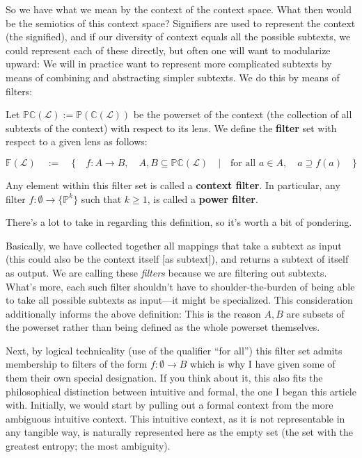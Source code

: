 \documentclass[twoside]{article}
\newenvironment{definition}[1][Definition]{\begin{trivlist}
\item[\hskip \labelsep {\bfseries #1:}]}{\end{trivlist}}
\begin{document}
So we have what we mean by the context of the context space. What then would be the semiotics of this context space?
Signifiers are used to represent the context (the signified), and if our diversity of context equals all the possible subtexts,
we could represent each of these directly, but often one will want to modularize upward: We will in practice want to represent
more complicated subtexts by means of combining and abstracting simpler subtexts. We do this by means of filters:

\begin{definition}[Context Space - Semiotics]

Let $ \mathbb{PC}(\mathcal{L}):=\mathbb{P}(\mathbb{C}(\mathcal{L})) $ be the powerset of the context
(the collection of all subtexts of the context) with respect to its lens.
We define the {\bfseries filter} set with respect to a given lens as follows:

$$ \mathbb{F}(\mathcal{L})\quad:=\quad\{\quad f:A\to B,\quad A,B\subseteq\mathbb{PC}(\mathcal{L})\quad
	|\quad\mbox{for all }a\in A,\quad a\supseteq f(a)\quad\} $$

Any element within this filter set is called a {\bfseries context filter}.  In particular, any filter
$ f:\emptyset\to\{\mathbb{P}^k\} $ such that $ k\ge 1 $, is called a {\bfseries power filter}.

\end{definition}

There's a lot to take in regarding this definition, so it's worth a bit of pondering.

Basically, we have collected together all mappings that take a subtext as input (this could also be the context itself
[as subtext]), and returns a subtext of itself as output. We are calling these \emph{filters} because we are filtering
out subtexts. What's more, each such filter shouldn't have to shoulder-the-burden of being able to take all possible
subtexts as input---it might be specialized. This consideration additionally informs the above definition: This is the
reason $ A,B $ are subsets of the powerset rather than being defined as the whole powerset themselves.

Next, by logical technicality (use of the qualifier ``for all'') this filter set admits membership to filters of the form
$ f:\emptyset\to B $ which is why I have given some of them their own special designation.  If you think about it, this also
fits the philosophical distinction between intuitive and formal, the one I began this article with. Initially, we would start
by pulling out a formal context from the more ambiguous intuitive context. This intuitive context, as it is not representable
in any tangible way, is naturally represented here as the empty set (the set with the greatest entropy; the most ambiguity).
\end{document}
